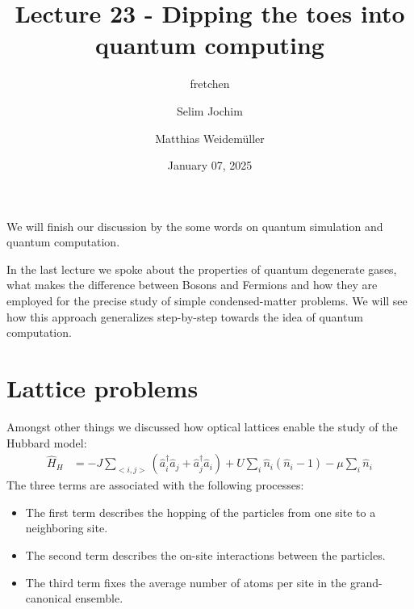 \documentclass[10pt]{article}
\renewenvironment{abstract}
  {{\bfseries\noindent{\abstractname}\par\nobreak}\footnotesize}
  {\bigskip}
\begin{document}
\title{Lecture 23  - Dipping the toes into quantum computing}



\author[1]{fretchen}%
\author[2]{Selim Jochim}%
\author[2]{Matthias Weidemüller}%
%
%


\vspace{-1em}



  
  \date{January 07, 2025}


\begingroup
\let\center\flushleft
\let\endcenter\endflushleft
\maketitle
\endgroup





\begin{abstract}
We will finish our discussion by the some words on quantum simulation and quantum computation.%
\end{abstract}%



\sloppy


In the last lecture  we spoke about the properties of quantum degenerate gases, what makes the difference between Bosons and Fermions and how they are employed for the precise study of simple condensed-matter problems. We will see how this approach generalizes step-by-step towards the idea of quantum computation.

\section{Lattice problems}
Amongst other things we discussed how optical lattices enable the study of the Hubbard model:
\begin{align}
\hat{H}_{H}&= -J \sum_{<i,j>} (\hat{a}^\dag_i \hat{a}_j +\hat{a}^\dag_j \hat{a}_i )+U\sum_i\hat{n}_i(\hat{n}_i-1)-\mu \sum_i \hat{n}_i
\end{align}
The three terms are associated with the following processes:
\begin{itemize}
\item The first term describes the hopping of the particles from one site to a neighboring site.
\item The second term describes the on-site interactions between the particles.
\item The third term fixes the average number of atoms per site in the grand-canonical ensemble.
\end{itemize}
\end{document}
